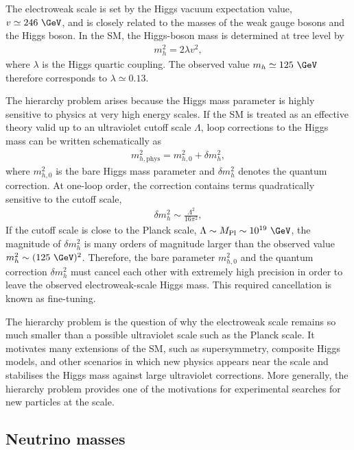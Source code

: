 The electroweak scale is set by the Higgs vacuum expectation value, $v\simeq246~\GeV$, and is closely related to the masses of the weak gauge bosons and the Higgs boson. 
In the SM, the Higgs-boson mass is determined at tree level by
\begin{align}
    m_{h}^{2}
    =
    2\lambda v^{2},
    \label{eq:higgs_mass_lambda}
\end{align}
where $\lambda$ is the Higgs quartic coupling. 
The observed value $m_{h}\simeq125~\GeV$ therefore corresponds to $\lambda\simeq0.13$.

The hierarchy problem arises because the Higgs mass parameter is highly sensitive to physics at very high energy scales. 
If the SM is treated as an effective theory valid up to an ultraviolet cutoff scale $\Lambda$, loop corrections to the Higgs mass can be written schematically as
\begin{align}
    m_{h,\mathrm{phys}}^{2}
    =
    m_{h,0}^{2}
    +
    \delta m_{h}^{2},
    \label{eq:higgs_mass_correction}
\end{align}
where $m_{h,0}^{2}$ is the bare Higgs mass parameter and $\delta m_{h}^{2}$ denotes the quantum correction. 
At one-loop order, the correction contains terms quadratically sensitive to the cutoff scale,
\begin{align}
    \delta m_{h}^{2}
    \sim
    \frac{\Lambda^{2}}{16\pi^{2}},
    \label{eq:higgs_quadratic_correction}
\end{align}
If the cutoff scale is close to the Planck scale, $\Lambda\sim M_{\mathrm{Pl}}\sim10^{19}~\GeV$, the magnitude of $\delta m_{h}^{2}$ is many orders of magnitude larger than the observed value $m_{h}^{2}\sim(125~\GeV)^{2}$. 
Therefore, the bare parameter $m_{h,0}^{2}$ and the quantum correction $\delta m_{h}^{2}$ must cancel each other with extremely high precision in order to leave the observed electroweak-scale Higgs mass. 
This required cancellation is known as fine-tuning.

The hierarchy problem is the question of why the electroweak scale remains so much smaller than a possible ultraviolet scale such as the Planck scale. 
It motivates many extensions of the SM, such as supersymmetry, composite Higgs models, and other scenarios in which new physics appears near the \TeV{} scale and stabilises the Higgs mass against large ultraviolet corrections. 
More generally, the hierarchy problem provides one of the motivations for experimental searches for new particles at the \TeV{} scale. 


\subsection{Neutrino masses}
\label{subsec:neutrino_masses}

